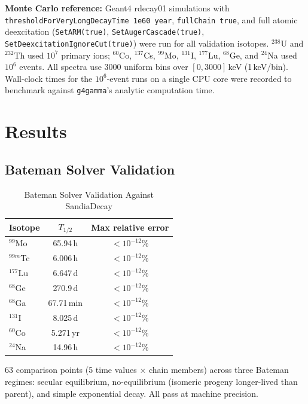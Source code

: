 \documentclass[journal]{IEEEtran}
\begin{document}
\textbf{Monte Carlo reference:} Geant4 rdecay01 simulations with
\texttt{thresholdForVeryLongDecayTime 1e60 year}, \texttt{fullChain true}, and
full atomic deexcitation (\texttt{SetARM(true)}, \texttt{SetAugerCascade(true)},
\texttt{SetDeexcitationIgnoreCut(true)}) were run for all validation isotopes.
$^{238}$U and $^{232}$Th used $10^7$ primary ions; $^{60}$Co, $^{137}$Cs,
$^{99}$Mo, $^{131}$I, $^{177}$Lu, $^{68}$Ge, and $^{24}$Na used $10^6$ events.
All spectra use 3000 uniform bins over $[0, 3000]$\,keV (1\,keV/bin).
Wall-clock times for the $10^6$-event runs on a single CPU core were recorded
to benchmark against \texttt{g4gamma}'s analytic computation time.

\section{Results}

\subsection{Bateman Solver Validation}

\begin{table}[!t]
  \caption{Bateman Solver Validation Against SandiaDecay}
  \label{tab:bateman}
  \centering
  \begin{tabular}{lcc}
    \toprule
    Isotope & $T_{1/2}$ & Max relative error \\
    \midrule
    $^{99}$Mo  & 65.94\,h  & $<10^{-12}$\% \\
    $^{99m}$Tc & 6.006\,h  & $<10^{-12}$\% \\
    $^{177}$Lu & 6.647\,d  & $<10^{-12}$\% \\
    $^{68}$Ge  & 270.9\,d  & $<10^{-12}$\% \\
    $^{68}$Ga  & 67.71\,min& $<10^{-12}$\% \\
    $^{131}$I  & 8.025\,d  & $<10^{-12}$\% \\
    $^{60}$Co  & 5.271\,yr & $<10^{-12}$\% \\
    $^{24}$Na  & 14.96\,h  & $<10^{-12}$\% \\
    \bottomrule
  \end{tabular}
  \par\smallskip
  \footnotesize 63 comparison points (5 time values $\times$ chain members) across
  three Bateman regimes: secular equilibrium, no-equilibrium (isomeric progeny
  longer-lived than parent), and simple exponential decay.
  All pass at machine precision.
\end{table}
\end{document}
